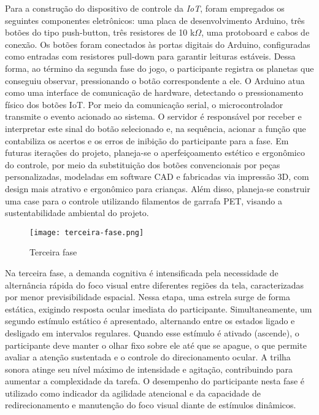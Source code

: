 Para a construção do dispositivo de controle da \textit{IoT}, foram empregados os seguintes componentes eletrônicos: uma placa de desenvolvimento Arduino, três botões do tipo push-button, três resistores de 10 k$\Omega$, uma protoboard e cabos de conexão. Os botões foram conectados às portas digitais do Arduino, configuradas como entradas com resistores pull-down para garantir leituras estáveis. Dessa forma, ao término da segunda fase do jogo, o participante registra os planetas que conseguiu observar, pressionando o botão correspondente a ele. O Arduino atua como uma interface de comunicação de hardware, detectando o pressionamento físico dos botões IoT. Por meio da comunicação serial, o microcontrolador transmite o evento acionado ao sistema. O servidor é responsável por receber e interpretar este sinal do botão selecionado e, na sequência, acionar a função que contabiliza os acertos e os erros de inibição do participante para a fase.
Em futuras iterações do projeto, planeja-se o aperfeiçoamento estético e ergonômico do controle, por meio da substituição dos botões convencionais por peças personalizadas, modeladas em software CAD e fabricadas via impressão 3D, com design mais atrativo e ergonômico para crianças. Além disso, planeja-se construir uma case para o controle utilizando filamentos de garrafa PET, visando a sustentabilidade ambiental do projeto.

\begin{figure}[H]
    \centering
    \caption{Terceira fase}%
    \label{fig:terceira-fase}
    \texttt{[image: terceira-fase.png]}%
\end{figure}

Na terceira fase, a demanda cognitiva é intensificada pela necessidade de alternância rápida do foco visual entre diferentes regiões da tela, caracterizadas por menor previsibilidade espacial. Nessa etapa, uma estrela surge de forma estática, exigindo resposta ocular imediata do participante. Simultaneamente, um segundo estímulo estático é apresentado, alternando entre os estados ligado e desligado em intervalos regulares. Quando esse estímulo é ativado (ascende), o participante deve manter o olhar fixo sobre ele até que se apague, o que permite avaliar a atenção sustentada e o controle do direcionamento ocular. A trilha sonora atinge seu nível máximo de intensidade e agitação, contribuindo para aumentar a complexidade da tarefa. O desempenho do participante nesta fase é utilizado como indicador da agilidade atencional e da capacidade de redirecionamento e manutenção do foco visual diante de estímulos dinâmicos.


